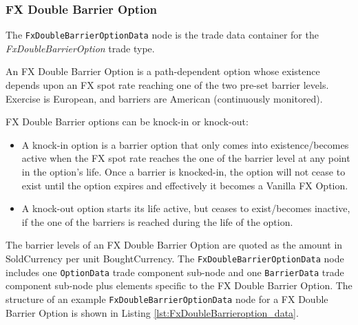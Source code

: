 \subsubsection{FX Double Barrier Option}

The \lstinline!FxDoubleBarrierOptionData!  node is the trade data container for the \emph{FxDoubleBarrierOption} trade type.  

An FX Double Barrier Option is a path-dependent option whose existence depends upon
an FX spot rate reaching one of the two pre-set barrier levels. Exercise is European, and barriers are American (continuously monitored).

FX Double Barrier options can be knock-in or knock-out:
\begin{itemize}
\item A knock-in option is a barrier option that only comes into existence/becomes active
when the FX spot rate reaches the one of the barrier level at any point in the
option's life. Once a barrier is knocked-in, the option will not cease to exist until
the option expires and effectively it becomes a Vanilla FX Option.
\item A knock-out option starts its life active, but ceases to exist/becomes inactive, if
the one of the barriers is reached during the life of the option.
\end{itemize}

The barrier levels of an FX Double Barrier Option are quoted as the amount in SoldCurrency
per unit BoughtCurrency. The \lstinline!FxDoubleBarrierOptionData!  node includes one  \lstinline!OptionData! trade component sub-node and one \lstinline!BarrierData! trade component sub-node plus elements
specific to the FX Double Barrier Option. The structure of an example \lstinline!FxDoubleBarrierOptionData! node for a FX Double Barrier Option is shown in Listing
\ref{lst:FxDoubleBarrieroption_data}.

